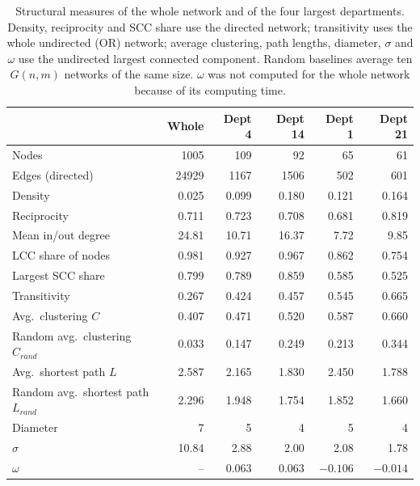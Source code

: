 \documentclass[12pt, a4paper]{article}
\begin{document}
\begin{table}[ht]
\centering
\small
\begin{tabular}{lrrrrr}
\toprule
 & Whole & Dept 4 & Dept 14 & Dept 1 & Dept 21 \\
\midrule
Nodes                         & 1005  & 109   & 92    & 65    & 61    \\
Edges (directed)              & 24929 & 1167  & 1506  & 502   & 601   \\
Density                       & 0.025 & 0.099 & 0.180 & 0.121 & 0.164 \\
Reciprocity                   & 0.711 & 0.723 & 0.708 & 0.681 & 0.819 \\
Mean in/out degree            & 24.81 & 10.71 & 16.37 & 7.72  & 9.85  \\
LCC share of nodes            & 0.981 & 0.927 & 0.967 & 0.862 & 0.754 \\
Largest SCC share             & 0.799 & 0.789 & 0.859 & 0.585 & 0.525 \\
Transitivity                  & 0.267 & 0.424 & 0.457 & 0.545 & 0.665 \\
Avg.\ clustering $C$          & 0.407 & 0.471 & 0.520 & 0.587 & 0.660 \\
Random avg.\ clustering $C_{rand}$ & 0.033 & 0.147 & 0.249 & 0.213 & 0.344 \\
Avg.\ shortest path $L$       & 2.587 & 2.165 & 1.830 & 2.450 & 1.788 \\
Random avg.\ shortest path $L_{rand}$ & 2.296 & 1.948 & 1.754 & 1.852 & 1.660 \\
Diameter                      & 7     & 5     & 4     & 5     & 4     \\
$\sigma$                      & 10.84 & 2.88  & 2.00  & 2.08  & 1.78  \\
$\omega$                      & --    & $0.063$ & $0.063$ & $-0.106$ & $-0.014$ \\
\bottomrule
\end{tabular}
\caption{Structural measures of the whole network and of the four largest
departments. Density, reciprocity and SCC share use the directed network;
transitivity uses the whole undirected (OR) network; average clustering, path
lengths, diameter, $\sigma$ and $\omega$ use the undirected largest connected
component. Random baselines average ten $G(n,m)$ networks of the same size.
$\omega$ was not computed for the whole network because of its computing time.}
\label{tab:structure}
\end{table}
\end{document}
